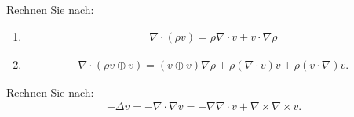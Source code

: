 \begin{uebung}
  Rechnen Sie nach:
  \begin{enumerate}
  \item
    \begin{align*}
      \nabla\cdot(\rho v) = \rho \nabla \cdot v + v \cdot \nabla \rho
    \end{align*}
\item
  \begin{align*}
    \nabla \cdot (\rho v \oplus v) = (v \oplus v) \nabla \rho + \rho (\nabla \cdot v )v + \rho (v \cdot \nabla)v.
  \end{align*}
  \end{enumerate}
\end{uebung}
\begin{uebung}
  Rechnen Sie nach:
  \begin{align*}
    - \Delta v = - \nabla \cdot \nabla v = - \nabla \nabla \cdot v + \nabla \times \nabla \times v.
  \end{align*}
\end{uebung}